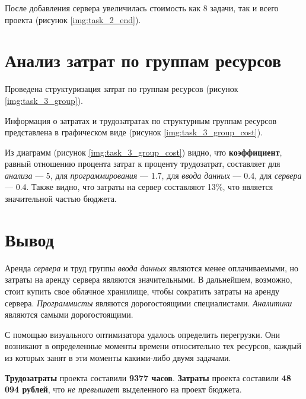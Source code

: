 После добавления сервера увеличилась стоимость как 8 задачи, так и всего проекта (рисунок \ref{img:task_2_end}).

\clearpage
\section{Анализ затрат по группам ресурсов}
Проведена структуризация затрат по группам ресурсов (рисунок \ref{img:task_3_group}).

Информация о затратах и трудозатратах по структурным группам ресурсов представлена в 
графическом виде (рисунок \ref{img:task_3_group_cost}).

\newpage
Из диаграмм (рисунок \ref{img:task_3_group_cost}) видно, что \textbf{коэффициент}, равный отношению процента затрат к 
проценту трудозатрат, составляет для \textit{анализа} --- 5,  для \textit{программирования} --- 1.7, для \textit{ввода данных} --- 0.4, для \textit{сервера} --- 0.4. Также видно, что затраты на сервер составляют 13\%, что является значительной частью бюджета.

\section{Вывод}

Аренда \textit{сервера} и труд группы \textit{ввода данных} являются менее оплачиваемыми, но затраты на аренду сервера являются значительными. В дальнейшем, возможно, стоит купить свое облачное хранилище, чтобы сократить затраты на аренду сервера. \textit{Программисты} являются дорогостоящими специалистами.
\textit{Аналитики} являются самыми дорогостоящими. 

С помощью визуального оптимизатора удалось определить перегрузки. Они возникают в
определенные моменты времени относительно тех ресурсов, каждый из которых 
занят в эти моменты какими-либо двумя задачами.

\textbf{Трудозатраты} проекта составили \textbf{9377 часов}. \textbf{Затраты} проекта составили \textbf{48 094 рублей}, что \textit{не превышает} выделенного на проект бюджета.
